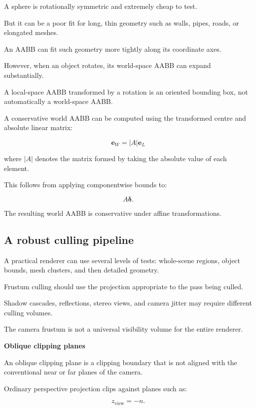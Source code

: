 A sphere is rotationally symmetric and extremely cheap to test.

But it can be a poor fit for long, thin geometry such as walls, pipes, roads, or elongated meshes.

An AABB can fit such geometry more tightly along its coordinate axes.

However, when an object rotates, its world-space AABB can expand substantially.

A local-space AABB transformed by a rotation is an oriented bounding box, not automatically a world-space AABB.

A conservative world AABB can be computed using the transformed centre and absolute linear matrix:

\[
 \boxed{ \mathbf e_W=|A|\mathbf e_L }
\]

where \(|A|\) denotes the matrix formed by taking the absolute value of each element.

This follows from applying componentwise bounds to:

\[
 A\boldsymbol\delta.
\]

The resulting world AABB is conservative under affine transformations.

\subsection{A robust culling pipeline}\label{02-foundations-ii-ch034-a-robust-culling-pipeline}

\hypertarget{02-foundations-ii-ch034-a-robust-culling-pipeline}{}

A practical renderer can use several levels of tests: whole-scene regions, object bounds, mesh clusters, and then detailed geometry.

Frustum culling should use the projection appropriate to the pass being culled.

Shadow cascades, reflections, stereo views, and camera jitter may require different culling volumes.

The camera frustum is not a universal visibility volume for the entire renderer.

\textbf{Oblique clipping planes}

An oblique clipping plane is a clipping boundary that is not aligned with the conventional near or far planes of the camera.

Ordinary perspective projection clips against planes such as:

\[
 z_{\mathrm{view}}=-n.
\]

